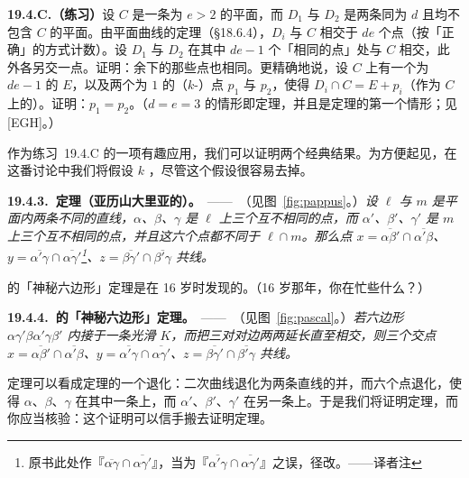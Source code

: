 \textbf{19.4.C.（练习）}\quad 设 $C$ 是一条\trDegree{}为 $e>2$ 的\trRegular{}平面\trCurve，而 $D_1$ 与 $D_2$ 是两条\trDegree{}同为 $d$ 且均不包含 $C$ 的平面\trCurve。由平面曲线的\trBezout{}定理（\S18.6.4），$D_i$ 与 $C$ 相交于 $de$ 个点（按「正确」的方式计数）。设 $D_1$ 与 $D_2$ 在其中 $de-1$ 个「相同的点」处与 $C$ 相交，此外各另交一点。证明：余下的那些点也相同。更精确地说，设 $C$ 上有一个\trDegree{}为 $de-1$ 的\trDivisor{} $E$，以及两个\trDegree{}为 $1$ 的（$k$-\trValuedPoint）点 $p_1$ 与 $p_2$，使得 $D_i\cap C=E+p_i$（作为 $C$ 上的\trDivisor）。证明：$p_1=p_2$。（$d=e=3$ 的情形即\trChasles{}定理，并且是\trCayleyBacharach{}定理的第一个情形；见 [EGH]。）

作为\mbox{练习~19.4.C} 的一项有趣应用，我们可以证明两个经典结果。为方便起见，在这番讨论中我们将假设 $k$ \trAlgClosed，尽管这个假设很容易去掉。

\textbf{19.4.3.\ \trPappus{}定理（亚历山大里亚的\trPappus）。}\ ——\ （见图~\ref{fig:pappus}。）\emph{设 $\ell$ 与 $m$ 是平面内两条不同的直线，$\alpha$、$\beta$、$\gamma$ 是 $\ell$ 上三个互不相同的点，而 $\alpha'$、$\beta'$、$\gamma'$ 是 $m$ 上三个互不相同的点，并且这六个点都不同于 $\ell\cap m$。那么点 $x=\overline{\alpha\beta'}\cap\overline{\alpha'\beta}$、$y=\overline{\alpha'\gamma}\cap\overline{\alpha\gamma'}$\footnote{原书此处作『$\overline{\alpha\gamma}\cap\overline{\alpha\gamma'}$』，当为『$\overline{\alpha'\gamma}\cap\overline{\alpha\gamma'}$』之误，径改。——译者注}、$z=\overline{\beta\gamma'}\cap\overline{\beta'\gamma}$ 共线。}

\trPascal{}的「神秘六边形」定理是\trPascal{}在 16 岁时发现的。（16 岁那年，你在忙些什么？）

\textbf{19.4.4.\ \trPascal{}的「神秘六边形」定理。}\ ——\ （见图~\ref{fig:pascal}。）\emph{若六边形 $\alpha\gamma'\beta\alpha'\gamma\beta'$ 内接于一条光滑\trConic{} $K$，而把三对对边两两延长直至相交，则三个交点 $x=\overline{\alpha\beta'}\cap\overline{\alpha'\beta}$、$y=\overline{\alpha'\gamma}\cap\overline{\alpha\gamma'}$、$z=\overline{\beta\gamma'}\cap\overline{\beta'\gamma}$ 共线。}

\trPappus{}定理可以看成\trPascal{}定理的一个退化：二次曲线退化为两条直线的并，而六个点退化，使得 $\alpha$、$\beta$、$\gamma$ 在其中一条上，而 $\alpha'$、$\beta'$、$\gamma'$ 在另一条上。于是我们将证明\trPascal{}定理，而你应当核验：这个证明可以信手搬去证明\trPappus{}定理。

